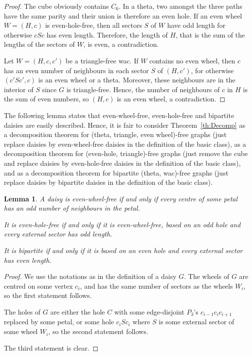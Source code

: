 \documentclass[11pt]{article}
\newtheorem{lemma}[theo]{Lemma}
\begin{document}
\begin{proof}
  The cube obviously contains $C_6$.  In a theta, two amongst the three paths have the same parity and their union is therefore an even hole.  If an  even wheel $W=(H, c)$ is even-hole-free, then  all  sectors $S$ of $W$ have odd length for otherwise $cSc$ has even length.  Therefore, the length of $H$, that is the sum of the lengths of the sectors of $W$, is even, a contradiction. 
  
  Let $W = (H, c, c')$ be a triangle-free wac. If $W$ contains no even wheel, then $c$ has an even number of neighbours in each sector $S$ of $(H, c')$, for otherwise $(c'Sc', c)$ is an even wheel or a theta. Moreover, these neighbours are in the interior of $S$ since $G$ is triangle-free.   Hence, the number of neighbours of $c$ in $H$ is the sum of even numbers, so $(H, c)$ is an even wheel, a contradiction.
\end{proof}




The following lemma states that even-wheel-free, even-hole-free and bipartite daisies are easily described.  
Hence, it is fair to consider Theorem~\ref{th:Decomp} as a decomposition theorem for (theta, triangle, even wheel)-free graphs (just replace daisies by even-wheel-free daisies in the definition of the basic class),  as a decomposition theorem for (even-hole, triangle)-free graphs (just remove the cube and replace daisies by even-hole-free daisies in the definition of the basic class), and as a decomposition theorem for bipartite (theta, wac)-free graphs (just replace daisies by bipartite daisies in the definition of the basic class). 


\begin{lemma}
  \label{l:daisyEHF}
  A daisy is even-wheel-free if and only if every centre of some petal has an odd number of neighbours in the  petal. 

  It is even-hole-free if and only if it is even-wheel-free, based on an odd hole and every external sector has odd length.
  
  It is bipartite if and only if it is based on an even hole and every external sector has even length. 
\end{lemma}

\begin{proof}
  We use the notations as in the definition of a daisy $G$. 
  The wheels of $G$ are centred on some vertex $c_i$, and has the same number of sectors as the wheels $W_i$, so the first statement follows.  
  
  The holes of $G$ are either the hole $C$ with some edge-disjoint $P_3$'s $c_{i-1} c_i c_{i+1}$ replaced by some petal, or some hole $c_iSc_i$ where $S$ is some external sector of some  wheel $W_i$, so the second statement follows.
  
  The third statement is clear. 
\end{proof}
\end{document}
